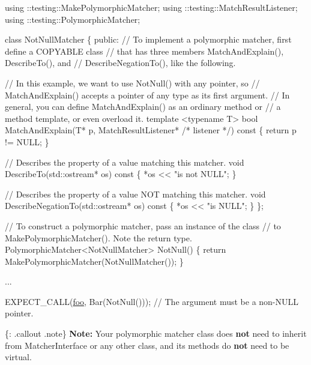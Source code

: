 \begin{DoxyCode}
using ::testing::MakePolymorphicMatcher;
using ::testing::MatchResultListener;
using ::testing::PolymorphicMatcher;

\textcolor{keyword}{class }NotNullMatcher \{
 \textcolor{keyword}{public}:
  \textcolor{comment}{// To implement a polymorphic matcher, first define a COPYABLE class}
  \textcolor{comment}{// that has three members MatchAndExplain(), DescribeTo(), and}
  \textcolor{comment}{// DescribeNegationTo(), like the following.}

  \textcolor{comment}{// In this example, we want to use NotNull() with any pointer, so}
  \textcolor{comment}{// MatchAndExplain() accepts a pointer of any type as its first argument.}
  \textcolor{comment}{// In general, you can define MatchAndExplain() as an ordinary method or}
  \textcolor{comment}{// a method template, or even overload it.}
  \textcolor{keyword}{template} <\textcolor{keyword}{typename} T>
  \textcolor{keywordtype}{bool} MatchAndExplain(T* p,
                       MatchResultListener* \textcolor{comment}{/* listener */})\textcolor{keyword}{ const }\{
    \textcolor{keywordflow}{return} p != NULL;
  \}

  \textcolor{comment}{// Describes the property of a value matching this matcher.}
  \textcolor{keywordtype}{void} DescribeTo(std::ostream* os)\textcolor{keyword}{ const }\{ *os << \textcolor{stringliteral}{"is not NULL"}; \}

  \textcolor{comment}{// Describes the property of a value NOT matching this matcher.}
  \textcolor{keywordtype}{void} DescribeNegationTo(std::ostream* os)\textcolor{keyword}{ const }\{ *os << \textcolor{stringliteral}{"is NULL"}; \}
\};

\textcolor{comment}{// To construct a polymorphic matcher, pass an instance of the class}
\textcolor{comment}{// to MakePolymorphicMatcher().  Note the return type.}
PolymorphicMatcher<NotNullMatcher> NotNull() \{
  \textcolor{keywordflow}{return} MakePolymorphicMatcher(NotNullMatcher());
\}

...

  EXPECT\_CALL(\mbox{\hyperlink{namespacefoo}{foo}}, Bar(NotNull()));  \textcolor{comment}{// The argument must be a non-NULL pointer.}
\end{DoxyCode}


\{\+: .callout .note\} {\bfseries Note\+:} Your polymorphic matcher class does {\bfseries not} need to inherit from {\ttfamily Matcher\+Interface} or any other class, and its methods do {\bfseries not} need to be virtual.

